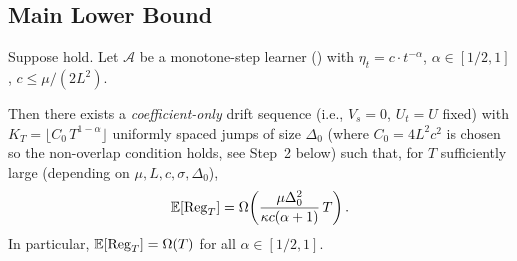 \subsection{Main Lower Bound}

\begin{theorem}
\label{thm:necessity}
Suppose  hold.
Let $\mathcal{A}$ be a monotone-step learner ()
with $\eta_t = c\cdot t^{-\alpha}$, $\alpha \in [1/2,1]$,
$c \leq \mu/(2L^2)$.

Then there exists a \emph{coefficient-only} drift sequence (i.e.,
$V_s = 0$, $U_t = U$ fixed) with
$K_T = \lfloor C_0\, T^{1-\alpha} \rfloor$ uniformly spaced jumps
of size $\Delta_0$ (where $C_0 = 4L^2c^2$ is chosen so the
non-overlap condition holds, see Step~2 below) such that,
for $T$ sufficiently large (depending on $\mu, L, c, \sigma, \Delta_0$),
\[
  \mathbb{E}[\mathrm{Reg}_T] = \Omega\!\left(
    \frac{\mu\Delta_0^2}{\kappa c(\alpha+1)}\, T
  \right).
\]
In particular, $\mathbb{E}[\mathrm{Reg}_T] = \Omega(T)$ for all $\alpha \in [1/2,1]$.
\end{theorem}

